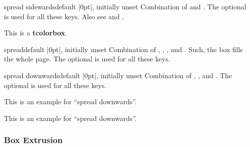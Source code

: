 \begin{docTcbKey}[][doc new=2017-02-13]{spread sidewards}{}{default |0pt|, initially unset}
Combination of  and .
The optional  is used for all these keys.
Also see  and .
\begin{dispListing}
\begin{tcolorbox}[enhanced,spread sidewards,
  colframe=blue!75!black,colback=white,show bounding box]
This is a \textbf{tcolorbox}.
\end{tcolorbox}
\end{dispListing}
{\tcbusetemp}
\end{docTcbKey}


\begin{docTcbKey}[][doc new=2017-02-13]{spread}{}{default |0pt|, initially unset}
Combination of
, , ,
and .
Such, the box fills the whole page.
The optional  is used for all these keys.
\end{docTcbKey}


\begin{docTcbKey}[][doc new=2017-02-13]{spread downwards}{}{default |0pt|, initially unset}
Combination of
, , and .
The optional  is used for all these keys.
\begin{dispListing}
\begin{tcolorbox}[enhanced,spread downwards,sharp corners=south,
  colframe=red!75!black,interior style={top color=white,bottom color=red!50}]
This is an example for \enquote{spread downwards}.
\end{tcolorbox}
\end{dispListing}
\end{docTcbKey}
\begin{tcolorbox}[enhanced,spread downwards,sharp corners=south,
  colframe=red!75!black,interior style={top color=white,bottom color=red!50}]
This is an example for \enquote{spread downwards}.
\end{tcolorbox}




\clearpage
\subsubsection{Box Extrusion}

